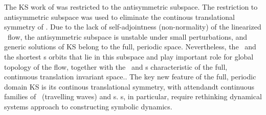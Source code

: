 


The KS work
of 
was restricted to the antisymmetric subspace.
The restriction to antisymmetric subspace was used
to eliminate the continous translational symmetry of \KSe.
Due to the lack of self-adjointness
(non-normality) of the linearized \KS\ flow, 
the antisymmetric subspace
is unstable under small perturbations, and generic solutions of 
KS belong to the full, periodic space.
Nevertheless, 
the \eqva\ and the shortest \po s orbits that lie in this subspace
and play important role for global topology of the flow,
together
with the \reqva\ and \rpo s
characteristic of the full, continuous translation invariant space..
The key new feature of the full, periodic domain
KS is its continous translational symmetry,
with attendandt continuous families of
\reqva\ (travelling waves) and \rpo s.
\Rpo s, in particular, require rethinking dynamical systems
approach to constructing symbolic dynamics. 

